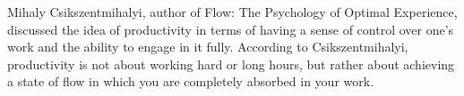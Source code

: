 Mihaly Csikszentmihalyi, author of Flow: The Psychology of Optimal Experience, discussed the idea of productivity in terms of having a sense of control over one's work and the ability to engage in it fully. According to Csikszentmihalyi, productivity is not about working hard or long hours, but rather about achieving a state of flow in which you are completely absorbed in your work.





